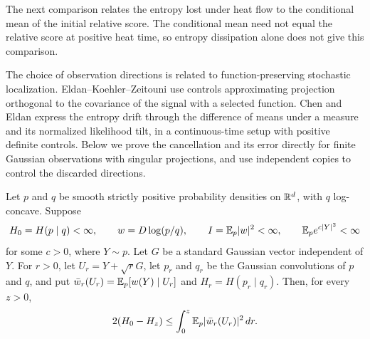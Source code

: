 The next comparison relates the entropy lost under heat flow to the
conditional mean of the initial relative score.  The conditional mean
need not equal the relative score at positive heat time, so entropy
dissipation alone does not give this comparison.

The choice of observation directions is related to function-preserving
stochastic localization. Eldan--Koehler--Zeitouni
\cite[Section~2, Lemma~2]{EldanKoehlerZeitouni2022} use controls
approximating projection orthogonal to the covariance of the signal
with a selected function. Chen and Eldan
\cite[Sections~2.4.2 and~3.2.3, Equation~(27)]{ChenEldan2022}
express the entropy drift through the difference of means under a
measure and its normalized likelihood tilt, in a continuous-time
setup with positive definite controls. Below we prove the cancellation
and its error directly for finite Gaussian observations with singular
projections, and use independent copies to control the discarded
directions.

\begin{lemma}
\label{lem:entropy-loss}
Let $p$ and $q$ be smooth strictly positive probability densities on
$\mathbb R^d$, with $q$ log-concave.  Suppose
\[
 H_0=H(p\mid q)<\infty,\qquad
 w=D\log(p/q),\qquad I=\mathbb E_p|w|^2<\infty,
 \qquad \mathbb E_p e^{c|Y|^2}<\infty
\]
for some $c>0$, where $Y\sim p$. Let $G$ be a standard Gaussian
vector independent of $Y$. For $r>0$, let
$U_r=Y+\sqrt rG$, let $p_r$ and $q_r$ be the Gaussian convolutions
of $p$ and $q$, and put
$\bar w_r(U_r)=\mathbb E_p[w(Y)\mid U_r]$ and $H_r=H(p_r\mid q_r)$.
Then, for every $z>0$,
\begin{equation}
 2(H_0-H_z)\le\int_0^z\mathbb E_p|\bar w_r(U_r)|^2\,dr.
 \label{eq:prediction-entropy-loss}
\end{equation}
\end{lemma}

